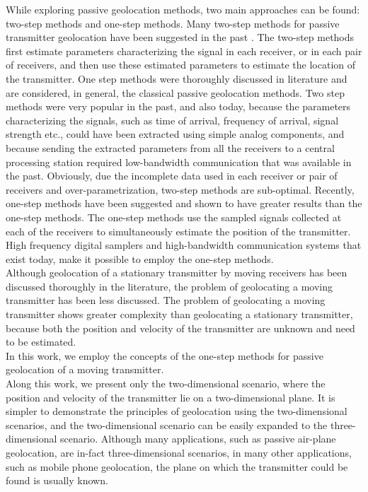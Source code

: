 While exploring passive geolocation methods, two main approaches can be found: two-step methods and one-step methods. Many two-step methods for passive transmitter geolocation have been suggested in the past \cite {musicki,musicki_kaune_koch,torrieri, chan_jardine, chan_towers, haworth, ho_chan,ho_xu}. The two-step methods first estimate parameters characterizing the signal in each receiver, or in each pair of receivers, and then use these estimated parameters to estimate the location of the transmitter. One step methods were thoroughly discussed in literature and are considered, in general, the classical passive geolocation methods. Two step methods were very popular in the past, and also today, because the parameters characterizing the signals, such as time of arrival, frequency of arrival, signal strength etc., could have been extracted using simple analog components, and because sending the extracted parameters from all the receivers to a central processing station required low-bandwidth communication that was available in the past. Obviously, due the incomplete data used in each receiver or pair of receivers and over-parametrization, two-step methods are sub-optimal.  Recently, one-step methods \cite{dpd,dpd_nb,dop_dpd_nb,dop_dpd_wb} have been suggested and shown to have greater results than the one-step methods. The one-step methods use the sampled signals collected at each of the receivers to simultaneously estimate the position of the transmitter. High frequency digital samplers and high-bandwidth communication systems that exist today, make it possible to employ the one-step methods.\\

Although geolocation of a stationary transmitter by moving receivers has been discussed thoroughly in the literature, the problem of geolocating a moving transmitter has been less discussed. The problem of geolocating a moving transmitter shows greater complexity than geolocating a stationary transmitter, because both the position and velocity of the transmitter are unknown and need to be estimated.\\

In this work, we employ the concepts of the one-step methods for passive geolocation of a moving transmitter. \\

Along this work, we present only the two-dimensional scenario, where the position and velocity of the transmitter lie on a two-dimensional plane. It is simpler to demonstrate the principles of geolocation using the two-dimensional scenarios, and the two-dimensional scenario can be easily expanded to the three-dimensional scenario. Although many applications, such as passive air-plane geolocation, are in-fact three-dimensional scenarios, in many other applications, such as mobile phone geolocation, the plane on which the transmitter could be found is usually known.

